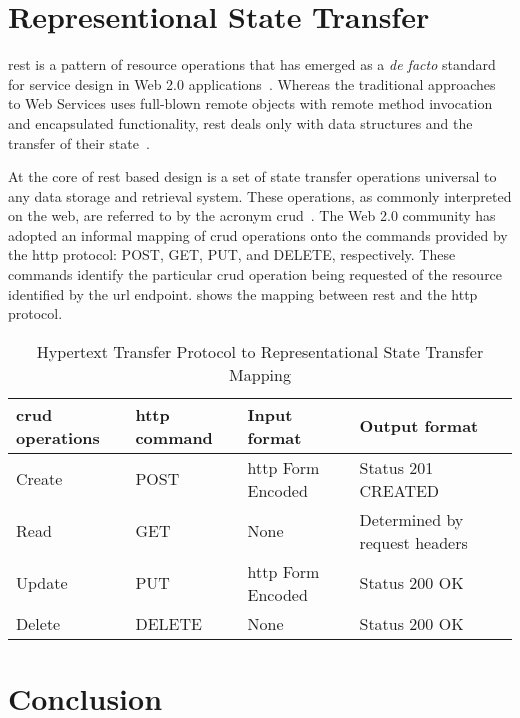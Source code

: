 \documentclass[
a4paper,
twoside,
headsepline,
cleardoublepage=empty,
parskip=half,
draft=false
]{scrbook}
\begin{document}
		\section{Representional State Transfer}\label{sec:rest}

			\gls{rest} is a pattern of resource operations that has emerged as a \textit{de facto} standard for service design in Web 2.0 applications~\cite{battle2008bridging}. Whereas the traditional approaches to Web Services uses full-blown remote objects with remote method invocation and encapsulated functionality, \gls{rest} deals only with data structures and the transfer of their state~\cite{fielding2000architectural}.
			
			At the core of \gls{rest} based design is a set of state transfer operations universal to any data storage and retrieval system.
			These operations, as commonly interpreted on the web, are referred to by the acronym \gls{crud}~\cite{battle2008bridging}.
			The Web 2.0 community has adopted an informal mapping of \gls{crud} operations onto the commands provided by the \gls{http} protocol: POST, GET, PUT, and DELETE, respectively. 
			These commands identify the particular \gls{crud} operation being requested of the resource identified by the \gls{url} endpoint.
			 shows the mapping between \gls{rest} and the \gls{http} protocol.
			
			\begin{table}[!h]
				\centering
				\caption{Hypertext Transfer Protocol to Representational State Transfer Mapping}
				\label{tab:http_rest_mapping}
				\begin{tabular}{@{}llll@{}}
					\toprule
					\gls{crud} operations & \gls{http} command & Input format & Output format
					\\ \midrule
					Create & POST & \gls{http} Form Encoded & Status 201 CREATED
					\\ \midrule
					Read & GET & None & Determined by request headers 
					\\ \midrule
					Update & PUT & \gls{http} Form Encoded & Status 200 OK
					\\ \midrule
					Delete & DELETE & None & Status 200 OK
					\\ \bottomrule
				\end{tabular}
			\end{table}
		
		\section{Conclusion}\label{sec:state_of_the_art_conclusion}
			
\end{document}
